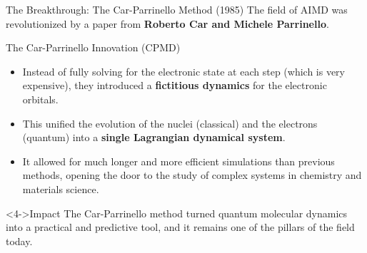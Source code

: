 
\begin{frame}{The Breakthrough: The Car-Parrinello Method (1985)}
    The field of AIMD was revolutionized by a paper from \textbf{Roberto Car and Michele Parrinello}.
    \pause
    
    \begin{block}{The Car-Parrinello Innovation (CPMD)}
        \begin{itemize}
            \item Instead of fully solving for the electronic state at each step (which is very expensive), they introduced a \textbf{fictitious dynamics} for the electronic orbitals.
            \pause
            \item This unified the evolution of the nuclei (classical) and the electrons (quantum) into a \textbf{single Lagrangian dynamical system}.
            \pause
            \item It allowed for much longer and more efficient simulations than previous methods, opening the door to the study of complex systems in chemistry and materials science.
        \end{itemize}
    \end{block}
    \pause
    
    \begin{exampleblock}<4->{Impact}
        The Car-Parrinello method turned quantum molecular dynamics into a practical and predictive tool, and it remains one of the pillars of the field today.
    \end{exampleblock}
\end{frame}


